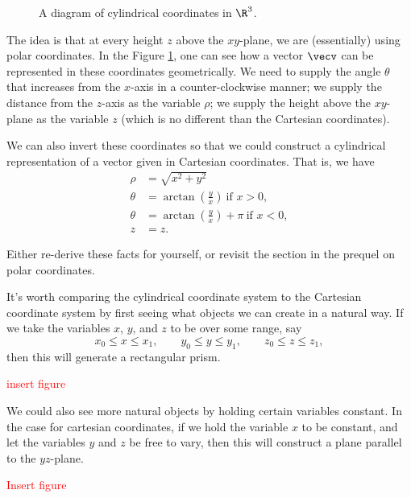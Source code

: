 \begin{figure}[H]
	\label{fig:cylindrical_coordinates}
	\centering
	\def\svgwidth{0.6\textwidth}
		
		\caption{A diagram of cylindrical coordinates in $\R^3$.}
\end{figure}

The idea is that at every height $z$ above the $xy$-plane, we are (essentially) using polar coordinates.  In the Figure \ref{fig:cylindrical_coordinates}, one can see how a vector $\vecv$ can be represented in these coordinates geometrically.  We need to supply the angle $\theta$ that increases from the $x$-axis in a counter-clockwise manner; we supply the distance from the $z$-axis as the variable $\rho$; we supply the height above the $xy$-plane as the variable $z$ (which is no different than the Cartesian coordinates).

We can also invert these coordinates so that we could construct a cylindrical representation of a vector given in Cartesian coordinates.  That is, we have
\begin{align*}
\rho &= \sqrt{x^2+y^2}\\
\theta &= \arctan\left(\frac{y}{x}\right) ~\textrm{if $x>0$}, \\
\theta &= \arctan\left(\frac{y}{x}\right) + \pi ~\textrm{if $x<0$},\\
z &= z.
\end{align*}

\begin{exercise}
	Either re-derive these facts for yourself, or revisit the section in the prequel on polar coordinates.
\end{exercise}

It's worth comparing the cylindrical coordinate system to the Cartesian coordinate system by first seeing what objects we can create in a natural way. If we take the variables $x$, $y$, and $z$ to be over some range, say
\[
x_0 \leq x \leq x_1, \qquad y_0 \leq y \leq y_1, \qquad z_0 \leq z \leq z_1,
\]
then this will generate a rectangular prism.

\textcolor{red}{insert figure}

 We could also see more natural objects by holding certain variables constant. In the case for cartesian coordinates, if we hold the variable $x$ to be constant, and let the variables $y$ and $z$ be free to vary, then this will construct a plane parallel to the $yz$-plane.

\textcolor{red}{Insert figure}

